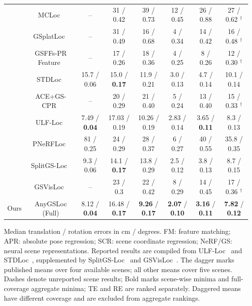 \begin{table}[tp]
\begin{tabular}{lccccccc}
 & MCLoc~\cite{reported260504730v1bibbib57} & -- & 31 / 0.42 & 39 / 0.73 & 12 / 0.45 & 26 / 0.88 & 27 / 0.62 $^\dagger$ \\
 & GSplatLoc~\cite{reported260504730v1bibbib47} & -- & 31 / 0.49 & 16 / 0.68 & 4 / 0.34 & 14 / 0.42 & 16 / 0.48 $^\dagger$ \\
 & GSFFs-PR Feature~\cite{reported260504730v1bibbib52} & -- & 17 / 0.26 & 18 / 0.36 & 4 / 0.25 & 8 / 0.26 & 12 / 0.30 $^\dagger$ \\
 & STDLoc~\cite{huang2025stdloc} & 15.7 / 0.06 & 15.0 / \textbf{0.17} & 11.9 / 0.21 & 3.0 / 0.13 & 4.7 / 0.14 & 10.1 / 0.14 \\
 & ACE+GS-CPR~\cite{reported260504730v1bibbib61} & -- & 20 / 0.29 & 21 / 0.40 & 5 / 0.24 & 13 / 0.40 & 15 / 0.33 $^\dagger$ \\
 & ULF-Loc~\cite{gu2026ulfloc} & 7.49 / \textbf{0.04} & 17.03 / 0.19 & 10.26 / 0.19 & 2.83 / 0.14 & 3.65 / \textbf{0.11} & 8.3 / 0.13 \\
 & PNeRFLoc~\cite{reported250319358v1bibbib68} & 81 / 0.25 & 24 / 0.29 & 28 / 0.37 & 6 / 0.27 & 40 / 0.55 & 35.8 / 0.35 \\
 & SplitGS-Loc~\cite{lee2026splitgsloc} & 9.3 / 0.06 & 14.1 / \textbf{0.17} & 13.8 / 0.29 & 2.5 / 0.12 & 3.8 / 0.13 & 8.7 / 0.15 \\
 & GSVisLoc~\cite{khatib2025gsvisloc} & -- & 23 / 0.3 & 22 / 0.42 & 8 / 0.29 & 14 / 0.45 & 17 / 0.36 $^\dagger$ \\
\midrule
Ours & AnyGSLoc (Full) & 8.12 / \textbf{0.04} & 16.48 / \textbf{0.17} & \textbf{9.26} / \textbf{0.17} & \textbf{2.07} / \textbf{0.10} & \textbf{3.16} / \textbf{0.11} & \textbf{7.82} / \textbf{0.12} \\
\bottomrule
\end{tabular}
\par\smallskip\begin{minipage}{0.98\linewidth}\footnotesize Median translation / rotation errors in cm / degrees. FM: feature matching; APR: absolute pose regression; SCR: scene coordinate regression; NeRF/GS: neural scene representations. Reported results are compiled from ULF-Loc~\cite{gu2026ulfloc} and STDLoc~\cite{huang2025stdloc}, supplemented by SplitGS-Loc~\cite{lee2026splitgsloc} and GSVisLoc~\cite{khatib2025gsvisloc}. The dagger marks published means over four available scenes; all other means cover five scenes. Dashes denote unreported scene results; Bold marks scene-wise minima and full-coverage aggregate minima; TE and RE are ranked separately. Daggered means have different coverage and are excluded from aggregate rankings.\end{minipage}
\end{table}

